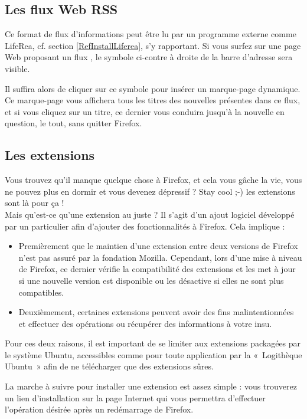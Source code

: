 \subsection{Les flux Web RSS}
Ce format de flux d'informations peut être lu par un programme externe comme LifeRea, cf. section \ref{RefInstallLiferea}, s'y rapportant. Si vous surfez sur une page Web proposant un flux , le symbole ci-contre à droite de la barre d'adresse sera visible.\par
{}
Il suffira alors de cliquer sur ce symbole pour insérer un marque-page dynamique. Ce marque-page vous affichera tous les titres des nouvelles présentes dans ce flux, et si vous cliquez sur un titre, ce dernier vous conduira jusqu'à la nouvelle en question, le tout, sans quitter Firefox.
\subsection{Les extensions}
Vous trouvez qu'il manque quelque chose à Firefox, et cela vous gâche la vie, vous ne pouvez plus en dormir et vous devenez dépressif ? Stay cool ;-) les extensions sont là pour ça !\\
Mais qu'est-ce qu'une extension au juste ? Il s'agit d'un ajout logiciel développé par un particulier afin d'ajouter des fonctionnalités à Firefox. Cela implique :\par
\begin{itemize}
\item Premièrement que le maintien d'une extension entre deux versions de Firefox n'est pas assuré par la fondation Mozilla. Cependant, lors d'une mise à niveau de Firefox, ce dernier vérifie la compatibilité des extensions et les met à jour si une nouvelle version est disponible ou les désactive si elles ne sont plus compatibles.
\item Deuxièmement, certaines extensions peuvent avoir des fins malintentionnées et effectuer des opérations ou récupérer des informations à votre insu.
\end{itemize}
Pour ces deux raisons, il est important de se limiter aux extensions packagées par le système Ubuntu, accessibles comme pour toute application par la «~Logithèque Ubuntu~» afin de ne télécharger que des extensions sûres.\par
La marche à suivre pour installer une extension est assez simple : vous trouverez un lien d'installation sur la page Internet qui vous permettra d'effectuer l'opération désirée après un redémarrage de Firefox.
